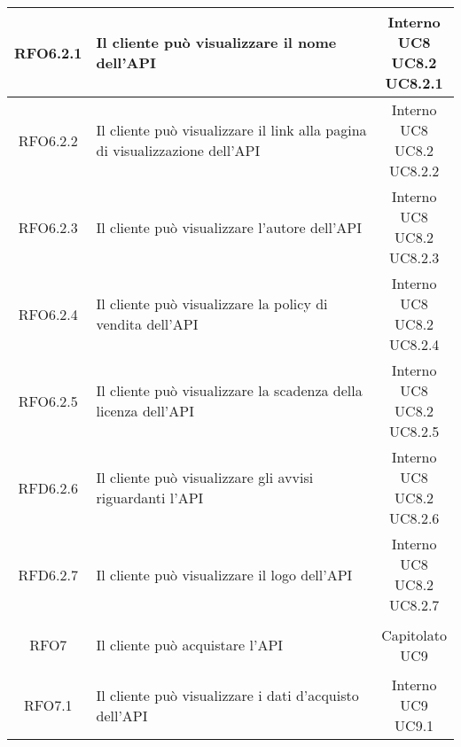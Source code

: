 \begin{longtable}{|c|p{8cm}|c|}
\hypertarget{RFO6.2.1}{RFO6.2.1} & Il cliente può visualizzare il nome dell'API & \makecell*{Interno\\UC8\\UC8.2\\UC8.2.1} \\
\hline
\hypertarget{RFO6.2.2}{RFO6.2.2} & Il cliente può visualizzare il link alla pagina di visualizzazione dell'API & \makecell*{Interno\\UC8\\UC8.2\\UC8.2.2} \\
\hline
\hypertarget{RFO6.2.3}{RFO6.2.3} & Il cliente può visualizzare l'autore dell'API & \makecell*{Interno\\UC8\\UC8.2\\UC8.2.3} \\
\hline
\hypertarget{RFO6.2.4}{RFO6.2.4} & Il cliente può visualizzare la policy di vendita dell'API & \makecell*{Interno\\UC8\\UC8.2\\UC8.2.4} \\
\hline
\hypertarget{RFO6.2.5}{RFO6.2.5} & Il cliente può visualizzare la scadenza della licenza dell'API & \makecell*{Interno\\UC8\\UC8.2\\UC8.2.5} \\
\hline
\hypertarget{RFD6.2.6}{RFD6.2.6} & Il cliente può visualizzare gli avvisi riguardanti l'API & \makecell*{Interno\\UC8\\UC8.2\\UC8.2.6} \\
\hline
\hypertarget{RFD6.2.7}{RFD6.2.7} & Il cliente può visualizzare il logo dell'API & \makecell*{Interno\\UC8\\UC8.2\\UC8.2.7} \\
\hline

\hypertarget{RFO7}{RFO7} & Il cliente può acquistare l'API & \makecell*{Capitolato\\UC9} \\
\hline

\hypertarget{RFO7.1}{RFO7.1} & Il cliente può visualizzare i dati d'acquisto dell'API & \makecell*{Interno\\UC9\\UC9.1} \\
\hline


\end{longtable}
